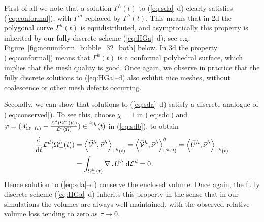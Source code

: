 First of all we note that a solution $\Gamma^h(t)$ to (\ref{eq:sda}--d) clearly
satisfies (\ref{eq:conformal}), with $\Gamma^m$ replaced by $\Gamma^h(t)$. This
means that in 2d the polygonal curve $\Gamma^h(t)$ is equidistributed, and
asymptotically this property is inherited by our fully discrete scheme
(\ref{eq:HGa}--d); see e.g. Figure~\ref{fig:nonuniform_bubble_32_both} below.
In 3d the property (\ref{eq:conformal}) means that $\Gamma^h(t)$ is a
conformal polyhedral surface, which implies that the mesh quality is good. Once
again, we observe in practice that the fully discrete solutions to
(\ref{eq:HGa}--d) also exhibit nice meshes, without coalescence or other
mesh defects occurring.

Secondly, we can show that solutions to (\ref{eq:sda}--d) satisfy a discrete
analogue of (\ref{eq:conserved}). To see this, choose $\chi = 1$ in
(\ref{eq:sdc}) and $\varphi= (\mathrm{\mathcal{X}}_{\Omega_-^h(t)} -
\frac{\mathcal{L}^d(\Omega_-^h(t))}{\mathcal{L}^d(\Omega)})
\in \widetilde{\mathbb{P}}^h(t)$ in (\ref{eq:sdb}), to obtain
\begin{align}\label{eq:stokes_volume_semidiscrete}
\frac{\rm d}{{\rm d}t} \mathcal{L}^d(\Omega_-^h(t))  &=
\left\langle \vec{\mathcal{V}}^h , \vec\nu^h \right\rangle_{\Gamma^h(t)}
= \left\langle \vec{\mathcal{V}}^h , \vec\nu^h \right\rangle^h_{\Gamma^h(t)}
= \left\langle \vec U^h, \vec\nu^h \right\rangle_{\Gamma^h(t)} \nonumber \\&
= \int_{\Omega_-^h(t)} \nabla\,.\,\vec U^h \;{\rm d}{\cal L}^{d} =0\,.
\end{align}
Hence solution to (\ref{eq:sda}--d) conserve the enclosed volume. Once again,
the fully discrete scheme (\ref{eq:HGa}--d) inherits this property in the sense
that in our simulations the volumes are always well maintained, with the
observed relative volume loss tending to zero as $\tau\to 0$.

